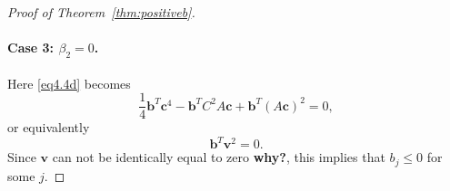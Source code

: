 \begin{proof}[Proof of Theorem~\ref{thm:positiveb}]
    \paragraph{Case 3: \( \beta_2 = 0 \).}
    Here \eqref{eq4.4d} becomes
    \begin{equation*}
        \frac{1}{4}\bm{b}^{T}\bm{c}^{4} - \bm{b}^{T}C^{2}A\bm{c} + \bm{b}^{T}(A\bm{c})^{2} = 0,
    \end{equation*}
    or equivalently
    \begin{equation*}
        \bm{b}^{T}\bm{v}^{2} = 0.
    \end{equation*}
    Since \( \bm{v} \) can not be identically equal to zero {\bf why?}, this implies that $b_j\le0$ for some $j$.
\end{proof}

